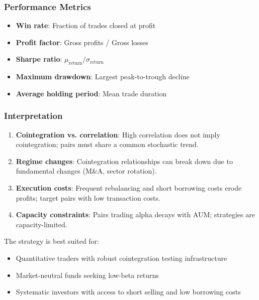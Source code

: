 \subsubsection{Performance Metrics}

\begin{itemize}
  \item \textbf{Win rate}: Fraction of trades closed at profit
  \item \textbf{Profit factor}: Gross profits / Gross losses
  \item \textbf{Sharpe ratio}: $\mu_{\text{return}} / \sigma_{\text{return}}$
  \item \textbf{Maximum drawdown}: Largest peak-to-trough decline
  \item \textbf{Average holding period}: Mean trade duration
\end{itemize}

\subsubsection{Interpretation}

\begin{enumerate}
  \item \textbf{Cointegration vs. correlation}: High correlation does not imply cointegration; pairs must share a common stochastic trend.

  \item \textbf{Regime changes}: Cointegration relationships can break down due to fundamental changes (M\&A, sector rotation).

  \item \textbf{Execution costs}: Frequent rebalancing and short borrowing costs erode profits; target pairs with low transaction costs.

  \item \textbf{Capacity constraints}: Pairs trading alpha decays with AUM; strategies are capacity-limited.
\end{enumerate}

The strategy is best suited for:
\begin{itemize}
  \item Quantitative traders with robust cointegration testing infrastructure
  \item Market-neutral funds seeking low-beta returns
  \item Systematic investors with access to short selling and low borrowing costs
\end{itemize}


